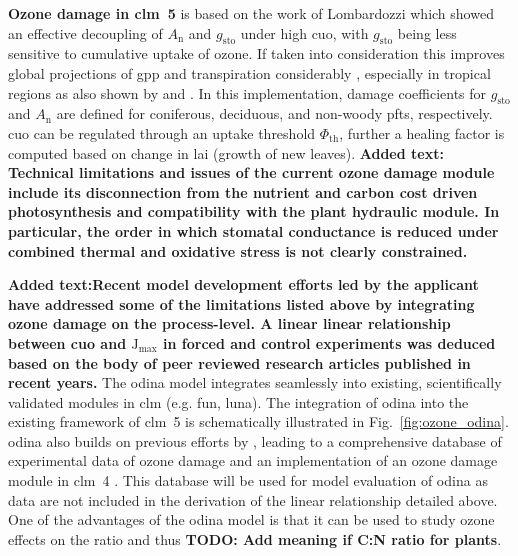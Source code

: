 \textbf{Ozone damage in \gls{clm}~5} is based on the work of Lombardozzi \textcite{Oe:Lombardozzi2012} which showed an effective decoupling of $A_\mathrm{n}$ and $g_\mathrm{sto}$ under high \gls{cuo}, with $g_\mathrm{sto}$ being less sensitive to cumulative uptake of ozone. If taken into consideration this improves global projections of \gls{gpp} and transpiration considerably \parencite{BGS:Lombardozzi2012}, especially in tropical regions as also shown by \textcite{Nat:Sitch2007} and \textcite{ACP:Pacifico2015}. In this implementation, damage coefficients for $g_\mathrm{sto}$ and $A_\mathrm{n}$ are defined for coniferous, deciduous, and non-woody \glspl{pft}, respectively. \gls{cuo} can be regulated through an uptake threshold $\Phi_\mathrm{th}$, further a healing factor is computed based on change in \gls{lai} (growth of new leaves). \textbf{\color{blue}Added text: Technical limitations and issues of the current ozone damage module include its disconnection from the nutrient and carbon cost driven photosynthesis and compatibility with the plant hydraulic module. In particular, the order in which stomatal conductance is reduced under combined thermal and oxidative stress is not clearly constrained.} 

\textbf{\color{blue}Added text:Recent model development efforts led by the applicant have addressed some of the limitations listed above by integrating ozone damage on the process-level. A linear linear relationship between \gls{cuo} and $\mathrm{J_{max}}$ in forced and control experiments was deduced based on the body of peer reviewed research articles published in recent years.} The \gls{odina} model integrates seamlessly into existing, scientifically validated modules in \gls{clm} (e.g. \gls{fun}, \gls{luna}). The integration of \gls{odina} into the existing framework of \gls{clm}~5 is schematically illustrated in Fig.~\ref{fig:ozone_odina}. \gls{odina} also builds on previous efforts by \textcites{BGS:Lombardozzi2012}{Oe:Lombardozzi2012}, leading to a comprehensive database of experimental data of ozone damage and an implementation of an ozone damage module in \gls{clm}~4 \parencite{BGS:Lombardozzi2013}. This database will be used for model evaluation of \gls{odina} as data are not included in the derivation of the linear relationship detailed above. One of the advantages of the \gls{odina} model is that it can be used to study ozone effects on the  ratio and thus \textbf{\color{red}TODO: Add meaning if C:N ratio for plants}.

